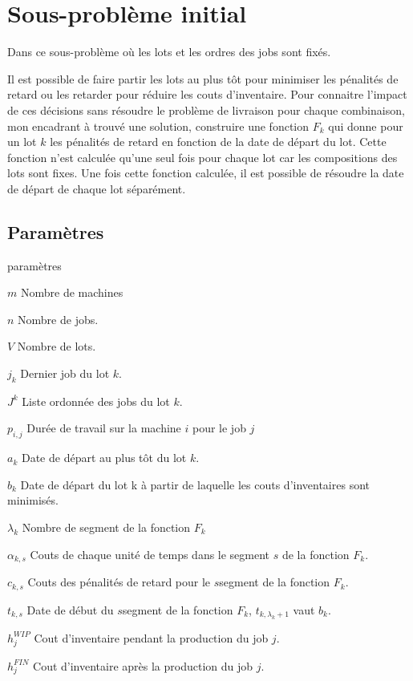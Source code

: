 \chapter{Sous-problème initial}

\label{appendix:modelisation_initiale}

Dans ce sous-problème où les lots et les ordres des jobs sont fixés.


Il est possible de faire partir les lots au plus tôt pour minimiser les pénalités de retard ou les retarder pour réduire les couts d'inventaire.
Pour connaitre l'impact de ces décisions sans résoudre le problème de livraison pour chaque combinaison,
mon encadrant à trouvé une solution, construire une fonction $F_k$ qui donne pour un lot $k$ les pénalités de retard en fonction de la date de départ du lot.
Cette fonction n'est calculée qu'une seul fois pour chaque lot car les compositions des lots sont fixes.
Une fois cette fonction calculée, il est possible de résoudre la date de départ de chaque lot séparément.

\section{Paramètres}
\begin{labeling}{paramètres}
	\item [$m$]
	Nombre de machines
	\item [$n$]
	Nombre de jobs.
	\item [$V$]
	Nombre de lots.
	\item [$j_k$]
	Dernier job du lot $k$.
	\item [$J^k$] 
	Liste ordonnée des jobs du lot $k$.
	\item [$p_{i, j}$]
	Durée de travail sur la machine $i$ pour le job $j$
	\item [$a_k$]
	Date de départ au plus tôt du lot $k$.
	\item [$b_k$]
	Date de départ du lot k à partir de laquelle les couts d'inventaires sont minimisés.
	\item [$\lambda_k$]
	Nombre de segment de la fonction $F_k$
	\item [$\alpha_{k, s}$]
	Couts de chaque unité de temps dans le segment $s$ de la fonction $F_k$.
	\item [$c_{k, s}$]
	Couts des pénalités de retard pour le $s$\ieme segment de la fonction $F_k$.
	\item [$t_{k, s}$]
	Date de début du $s$\ieme segment de la fonction $F_k$, $t_{k, \lambda_k+1}$ vaut $b_k$.
	\item [$h_{j}^{WIP}$] 
	Cout d'inventaire pendant la production du job $j$.
	\item [$h_{j}^{FIN}$] 
	Cout d'inventaire après la production du job $j$.
\end{labeling}



